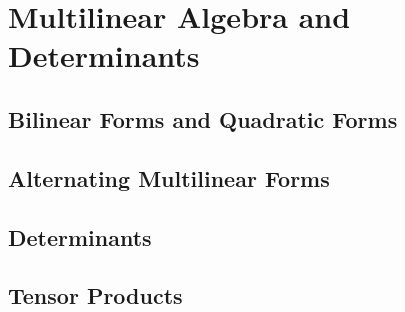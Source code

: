 \chapter{Multilinear Algebra and Determinants}

\section{Bilinear Forms and Quadratic Forms}

\section{Alternating Multilinear Forms}

\section{Determinants}

\section{Tensor Products}

